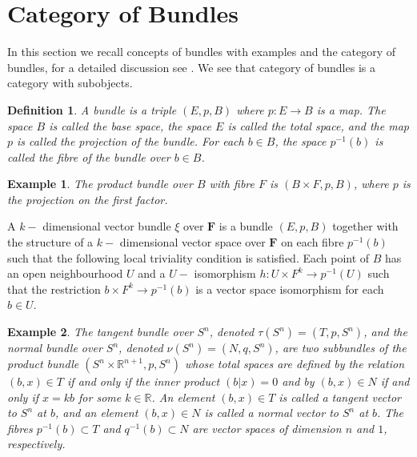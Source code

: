 \documentclass{amsart}
\theoremstyle{plain}
\newtheorem{exam}{Example}
\newtheorem{defn}{Definition}
\begin{document}

	
	\section{Category of Bundles}
	In this section we recall concepts of bundles with examples and the category of bundles, for a detailed discussion see \cite{Dale}. We see that category of bundles is a category with subobjects.
	
	\begin{defn}
		A bundle is a triple $(E,p,B)$ where $p: E \rightarrow B$ is a map. The space $B$ is called the base space, the space $E$ is called the total space, and the map $p$ is called the projection of the bundle. For each $b \in B$, the space $p^{-1} (b) $ is called the fibre of the bundle over $b \in B$. 
		\end{defn}
	
	
	\begin{exam}
		The product bundle over $B$ with fibre $F$ is $(B \times F, p,B)$, where $p$ is the projection on the first factor.
	\end{exam}

		A $k-$ dimensional vector bundle $\xi$ over $\textbf{F}$ is a bundle $(E,p,B)$ together with the structure of a $k-$ dimensional vector space over $\textbf{F}$ on each fibre $p^{-1} (b) $ such that the following local triviality condition is satisfied. Each point of $B$ has an open neighbourhood $U$ and a  $U-$ isomorphism $h: U \times F^k \rightarrow p^{-1}(U)$ such that the restriction $ b \times F^k \rightarrow p^{-1} (b)$ is a vector space isomorphism for each $b \in U$.
		
	\begin{exam}
		The tangent bundle over $S^n$, denoted $\tau (S^n) = (T, p, S^n)$, and the normal bundle over $S^n$, denoted $\nu (S^n) = (N, q, S^n)$, are two subbundles of the product bundle $(S^n \times \mathbb{R}^{n+1}, p, S^n)$ whose total spaces are defined by the relation $(b,x) \in T$ if and only if the inner product $(b|x) = 0$ and by $(b,x) \in N$ if and only if   $x = kb$ for some $k \in \mathbb{R}$. 
		An element $(b,x) \in T$ is called a tangent vector to $S^n$ at $b$, and an  element $(b,x) \in N$ is called a normal vector to $S^n$ at $b$. The fibres $p^{-1}(b) \subset T $ and $q^{-1}(b) \subset N $ are vector spaces of dimension $n$ and $1$, respectively.
	\end{exam}
\end{document}
